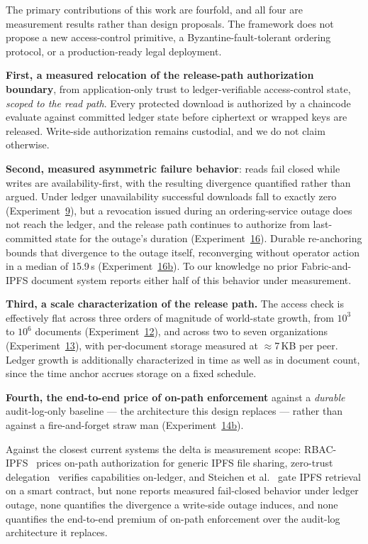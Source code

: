 \documentclass[preprint,12pt]{elsarticle}
\begin{document}
The primary contributions of this work are fourfold, and all four are
measurement results rather than design proposals. The framework does not
propose a new access-control primitive, a Byzantine-fault-tolerant ordering
protocol, or a production-ready legal deployment.

\textbf{First, a measured relocation of the release-path authorization
boundary}, from application-only trust to ledger-verifiable access-control
state, \emph{scoped to the read path}. Every protected download is
authorized by a chaincode evaluate against committed ledger state before
ciphertext or wrapped keys are released. Write-side authorization remains
custodial, and we do not claim otherwise.

\textbf{Second, measured asymmetric failure behavior}: reads fail closed
while writes are availability-first, with the resulting divergence
quantified rather than argued. Under ledger unavailability successful
downloads fall to exactly zero (Experiment~\hyperref[sec:exp_failclosed]{9}),
but a revocation issued during an ordering-service outage does not reach the
ledger, and the release path continues to authorize from last-committed
state for the outage's duration
(Experiment~\hyperref[sec:exp_orderer_outage]{16}). Durable re-anchoring
bounds that divergence to the outage itself, reconverging without operator
action in a median of 15.9\,s
(Experiment~\hyperref[sec:exp_orderer_reconcile]{16b}). To our knowledge no
prior Fabric-and-IPFS document system reports either half of this behavior
under measurement.

\textbf{Third, a scale characterization of the release path.} The access
check is effectively flat across three orders of magnitude of world-state
growth, from $10^3$ to $10^6$ documents
(Experiment~\hyperref[sec:exp_ledgergrowth]{12}), and across two to seven
organizations (Experiment~\hyperref[sec:exp_netscale]{13}), with
per-document storage measured at $\approx$7\,KB per peer. Ledger growth is
additionally characterized in time as well as in document count, since the
time anchor accrues storage on a fixed schedule.

\textbf{Fourth, the end-to-end price of on-path enforcement} against a
\emph{durable} audit-log-only baseline --- the architecture this design
replaces --- rather than against a fire-and-forget straw man
(Experiment~\hyperref[sec:exp_durable_baseline]{14b}).

Against the closest current systems the delta is measurement scope:
RBAC-IPFS~\cite{liu2026rbacipfs} prices on-path authorization for generic
IPFS file sharing, zero-trust delegation~\cite{mukta2026zerotrust} verifies
capabilities on-ledger, and Steichen et al.~\cite{steichen2018blockchain}
gate IPFS retrieval on a smart contract, but none reports measured
fail-closed behavior under ledger outage, none quantifies the divergence a
write-side outage induces, and none quantifies the end-to-end premium of
on-path enforcement over the audit-log architecture it replaces.
\end{document}
